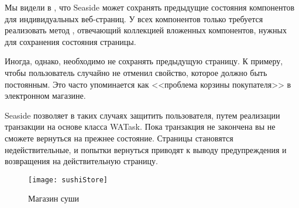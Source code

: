 \documentclass[a4paper,10pt,twoside]{book}
\begin{document}

Мы видели в ,
что Seaside может сохранять предыдущие состояния компонентов для
индивидуальных веб-страниц.
У всех компонентов только требуется реализовать метод ,
отвечающий коллекцией вложенных компонентов, нужных для сохранения
состояния страницы.


Иногда, однако, необходимо не сохранять предыдущую страницу.
К примеру, чтобы пользователь случайно не отменил свойство,
которое должно быть постоянным.
Это часто упоминается как <<проблема корзины покупателя>>
в электронном магазине.


Seaside позволяет в таких случаях защитить пользователя,
путем реализации транзакции на основе класса WATask.
Пока транзакция не закончена вы не сможете вернуться
на прежнее состояние.
Страницы становятся недействительные, и попытки
вернуться приводят к выводу предупреждения и возвращения
на действительную страницу.

\begin{figure}[ht]
\begin{center}
\texttt{[image: sushiStore]}
\caption{Магазин суши}
\end{center}
\end{figure}
\end{document}
